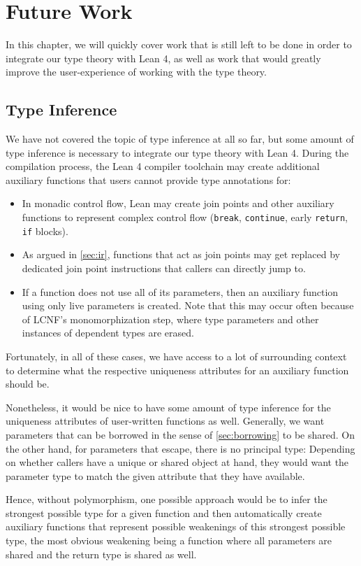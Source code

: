 \chapter{Future Work}\label{sec:futurework}
In this chapter, we will quickly cover work that is still left to be done in order to integrate our type theory with Lean 4, as well as work that would greatly improve the user-experience of working with the type theory.

\section{Type Inference}\label{sec:inference}
We have not covered the topic of type inference at all so far, but some amount of type inference is necessary to integrate our type theory with Lean 4. During the compilation process, the Lean 4 compiler toolchain may create additional auxiliary functions that users cannot provide type annotations for: 
\begin{itemize}
	\item In monadic control flow, Lean may create join points and other auxiliary functions to represent complex control flow (\lstinline|break|, \lstinline|continue|, early \lstinline|return|, \lstinline|if| blocks).
	\item As argued in \cref{sec:ir}, functions that act as join points may get replaced by dedicated join point instructions that callers can directly jump to.
	\item If a function does not use all of its parameters, then an auxiliary function using only live parameters is created. Note that this may occur often because of LCNF's monomorphization step, where type parameters and other instances of dependent types are erased.
\end{itemize}
Fortunately, in all of these cases, we have access to a lot of surrounding context to determine what the respective uniqueness attributes for an auxiliary function should be.

Nonetheless, it would be nice to have some amount of type inference for the uniqueness attributes of user-written functions as well. Generally, we want parameters that can be borrowed in the sense of \cref{sec:borrowing} to be shared. On the other hand, for parameters that escape, there is no principal type: Depending on whether callers have a unique or shared object at hand, they would want the parameter type to match the given attribute that they have available.

Hence, without polymorphism, one possible approach would be to infer the strongest possible type for a given function and then automatically create auxiliary functions that represent possible weakenings of this strongest possible type, the most obvious weakening being a function where all parameters are shared and the return type is shared as well.

